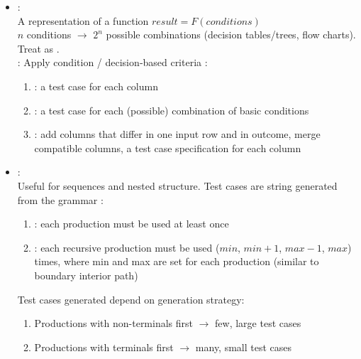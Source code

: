 \begin{itemize}
        \item {} :\\
        A representation of a function $result = F(conditions)$\\
        $n$ conditions $\rightarrow$ $2^n$ possible combinations (decision tables/trees, flow charts).\\
        Treat as .\\
         : Apply condition / decision‐based criteria : 
        \begin{enumerate}
            \item {} : a test case for each column
            \item {} : a test case for each (possible) combination of basic conditions
            \item {} : add columns that differ in one input row and in outcome, merge compatible columns, a test case specification for each column
        \end{enumerate}
        
        \item {} : \\
        Useful for sequences and nested structure. Test cases are string generated from the grammar : 
        \begin{enumerate}
            \item {} : each production must be used at least once
            \item {} : each recursive production must be used ($min$, $min+1$, $max-1$, $max$) times, where min and max are set for each production (similar to boundary interior path)
        \end{enumerate}
        Test cases generated depend on generation strategy:
        \begin{enumerate}
            \item Productions with non-terminals first $\rightarrow$ few, large test cases
            \item Productions with terminals first $\rightarrow$ many, small test cases
        \end{enumerate}
\end{itemize}

